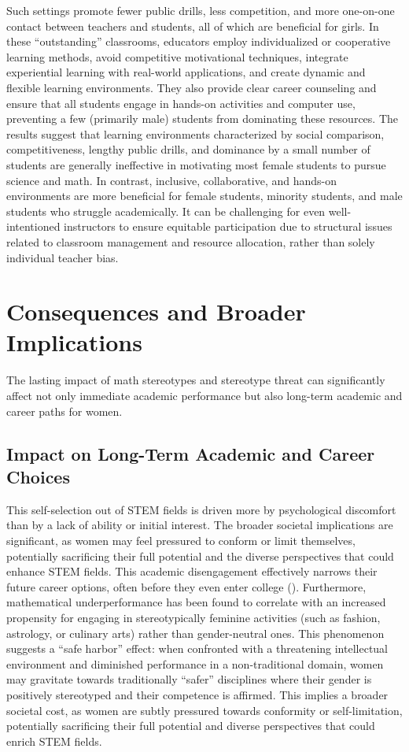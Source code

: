 Such settings promote fewer public drills, less competition, and more one-on-one contact between teachers and students, all of which are beneficial for girls. In these ``outstanding'' classrooms, educators employ individualized or cooperative learning methods, avoid competitive motivational techniques, integrate experiential learning with real-world applications, and create dynamic and flexible learning environments. They also provide clear career counseling and ensure that all students engage in hands-on activities and computer use, preventing a few (primarily male) students from dominating these resources.
The results suggest that learning environments characterized by social comparison, competitiveness, lengthy public drills, and dominance by a small number of students are generally ineffective in motivating most female students to pursue science and math. In contrast, inclusive, collaborative, and hands-on environments are more beneficial for female students, minority students, and male students who struggle academically. It can be challenging for even well-intentioned instructors to ensure equitable participation due to structural issues related to classroom management and resource allocation, rather than solely individual teacher bias.

\section{Consequences and Broader Implications}
The lasting impact of math stereotypes and stereotype threat can significantly affect not only immediate academic performance but also long-term academic and career paths for women.
\subsection{Impact on Long-Term Academic and Career Choices}

This self-selection out of STEM fields is driven more by psychological discomfort than by a lack of ability or initial interest. The broader societal implications are significant, as women may feel pressured to conform or limit themselves, potentially sacrificing their full potential and the diverse perspectives that could enhance STEM fields. This academic disengagement effectively narrows their future career options, often before they even enter college (\cite{GadassiGati2009}). Furthermore, mathematical underperformance has been found to correlate with an increased propensity for engaging in stereotypically feminine activities (such as fashion, astrology, or culinary arts) rather than gender-neutral ones. This phenomenon suggests a ``safe harbor'' effect: when confronted with a threatening intellectual environment and diminished performance in a non-traditional domain, women may gravitate towards traditionally ``safer'' disciplines where their gender is positively stereotyped and their competence is affirmed. This implies a broader societal cost, as women are subtly pressured towards conformity or self-limitation, potentially sacrificing their full potential and diverse perspectives that could enrich STEM fields. 
